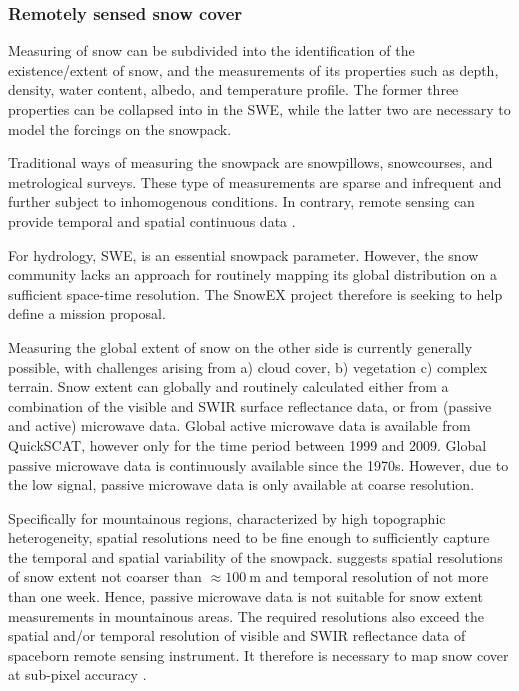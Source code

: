 \documentclass[a4paper,10pt]{article}
\begin{document}
\subsubsection{Remotely sensed snow cover}
Measuring of snow can be subdivided into the identification of the existence/extent of snow, and the measurements of its properties such as depth, density, water content, albedo, and temperature profile. The former three properties can be collapsed into in the \gls{SWE}, while the latter two are necessary to model the forcings on the snowpack.

Traditional ways of measuring the snowpack are snowpillows, snowcourses, and metrological surveys. These type of measurements are sparse and infrequent and further subject to inhomogenous conditions. In contrary, remote sensing can provide temporal and spatial continuous data \citep{Dozier2004, Nolin2010}.

For hydrology, \gls{SWE}, is an essential snowpack parameter. However, the snow community lacks an approach for routinely mapping its global distribution \citep{Lettenmaier2015} on a sufficient space-time resolution. The SnowEX \citep{Durand2017} project therefore is seeking to help define a mission proposal. 

Measuring the global extent of snow on the other side is currently generally possible, with challenges arising from a) cloud cover, b) vegetation c) complex terrain. Snow extent can globally and routinely calculated either from a combination of the visible and \gls{SWIR} surface reflectance data, or from (passive and active) microwave \citep{Frei2012} data. Global active microwave data is available from \gls{QuickSCAT}, however only for the time period between 1999 and 2009. Global passive microwave data is continuously available since the 1970s. However, due to the low signal, passive microwave data is only available at coarse resolution.

Specifically for mountainous regions, characterized by high topographic heterogeneity, spatial resolutions need to be fine enough to sufficiently capture the temporal and spatial variability of the snowpack. \cite{Lettenmaier2015} suggests spatial resolutions of snow extent not coarser than $\approx \SI{100}{\meter}$ and temporal resolution of not more than one week. Hence, passive microwave data is not suitable for snow extent measurements in mountainous areas. The required resolutions also exceed the spatial and/or temporal resolution of visible and \gls{SWIR} reflectance data of spaceborn remote sensing instrument. It therefore is necessary to map snow cover at sub-pixel accuracy \citep{Dozier2004}.
\end{document}
